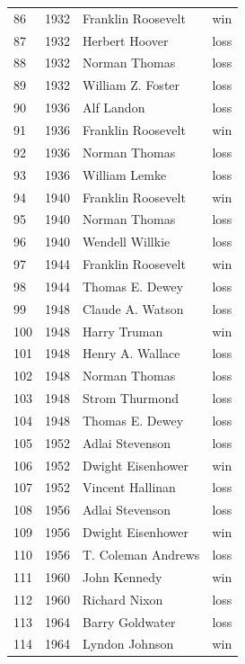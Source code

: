 \documentclass[
  letterpaper,
  DIV=11,
  numbers=noendperiod]{scrreprt}
\begin{document}
\begin{tabular}{lrll}
86  &  1932 &      Franklin Roosevelt &    win \\
87  &  1932 &          Herbert Hoover &   loss \\
88  &  1932 &           Norman Thomas &   loss \\
89  &  1932 &       William Z. Foster &   loss \\
90  &  1936 &              Alf Landon &   loss \\
91  &  1936 &      Franklin Roosevelt &    win \\
92  &  1936 &           Norman Thomas &   loss \\
93  &  1936 &           William Lemke &   loss \\
94  &  1940 &      Franklin Roosevelt &    win \\
95  &  1940 &           Norman Thomas &   loss \\
96  &  1940 &         Wendell Willkie &   loss \\
97  &  1944 &      Franklin Roosevelt &    win \\
98  &  1944 &         Thomas E. Dewey &   loss \\
99  &  1948 &        Claude A. Watson &   loss \\
100 &  1948 &            Harry Truman &    win \\
101 &  1948 &        Henry A. Wallace &   loss \\
102 &  1948 &           Norman Thomas &   loss \\
103 &  1948 &          Strom Thurmond &   loss \\
104 &  1948 &         Thomas E. Dewey &   loss \\
105 &  1952 &         Adlai Stevenson &   loss \\
106 &  1952 &       Dwight Eisenhower &    win \\
107 &  1952 &        Vincent Hallinan &   loss \\
108 &  1956 &         Adlai Stevenson &   loss \\
109 &  1956 &       Dwight Eisenhower &    win \\
110 &  1956 &      T. Coleman Andrews &   loss \\
111 &  1960 &            John Kennedy &    win \\
112 &  1960 &           Richard Nixon &   loss \\
113 &  1964 &         Barry Goldwater &   loss \\
114 &  1964 &          Lyndon Johnson &    win \\

\end{tabular}
\end{document}
